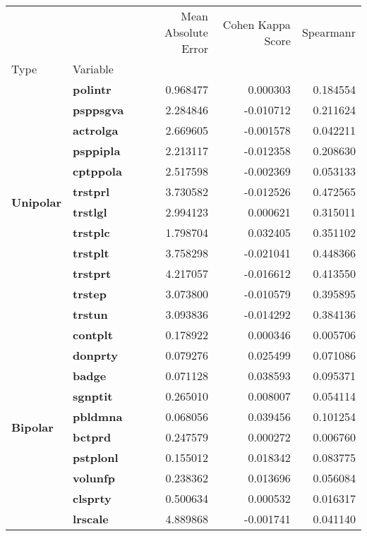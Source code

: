\begin{table}[H]
\begin{tabular}{llrrr}
\toprule
 &  & Mean Absolute Error & Cohen Kappa Score & Spearmanr \\
Type & Variable &  &  &  \\
\midrule
\multirow[t]{12}{*}{\textbf{Unipolar}} & \textbf{polintr} & 0.968477 & 0.000303 & 0.184554 \\
\textbf{} & \textbf{psppsgva} & 2.284846 & -0.010712 & 0.211624 \\
\textbf{} & \textbf{actrolga} & 2.669605 & -0.001578 & 0.042211 \\
\textbf{} & \textbf{psppipla} & 2.213117 & -0.012358 & 0.208630 \\
\textbf{} & \textbf{cptppola} & 2.517598 & -0.002369 & 0.053133 \\
\textbf{} & \textbf{trstprl} & 3.730582 & -0.012526 & 0.472565 \\
\textbf{} & \textbf{trstlgl} & 2.994123 & 0.000621 & 0.315011 \\
\textbf{} & \textbf{trstplc} & 1.798704 & 0.032405 & 0.351102 \\
\textbf{} & \textbf{trstplt} & 3.758298 & -0.021041 & 0.448366 \\
\textbf{} & \textbf{trstprt} & 4.217057 & -0.016612 & 0.413550 \\
\textbf{} & \textbf{trstep} & 3.073800 & -0.010579 & 0.395895 \\
\textbf{} & \textbf{trstun} & 3.093836 & -0.014292 & 0.384136 \\
\cline{1-5}
\multirow[t]{29}{*}{\textbf{Bipolar}} & \textbf{contplt} & 0.178922 & 0.000346 & 0.005706 \\
\textbf{} & \textbf{donprty} & 0.079276 & 0.025499 & 0.071086 \\
\textbf{} & \textbf{badge} & 0.071128 & 0.038593 & 0.095371 \\
\textbf{} & \textbf{sgnptit} & 0.265010 & 0.008007 & 0.054114 \\
\textbf{} & \textbf{pbldmna} & 0.068056 & 0.039456 & 0.101254 \\
\textbf{} & \textbf{bctprd} & 0.247579 & 0.000272 & 0.006760 \\
\textbf{} & \textbf{pstplonl} & 0.155012 & 0.018342 & 0.083775 \\
\textbf{} & \textbf{volunfp} & 0.238362 & 0.013696 & 0.056084 \\
\textbf{} & \textbf{clsprty} & 0.500634 & 0.000532 & 0.016317 \\
\textbf{} & \textbf{lrscale} & 4.889868 & -0.001741 & 0.041140 \\

\end{tabular}
\end{table}
